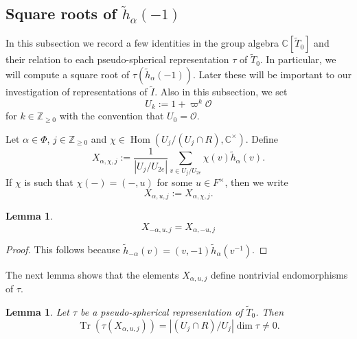 \documentclass[10pt, letterpaper]{amsart}
\theoremstyle{plain}
\newtheorem{Lem}[equation]{Lemma}
\theoremstyle{definition}
\numberwithin{equation}{section}
\newcommand{\Z}{\mathbb{Z}}
\newcommand{\htt}{\tilde{h}}
\newcommand{\It}{\widetilde{I}}
\newcommand{\Tt}{\widetilde{T}}
\newcommand{\Hom}{\operatorname{Hom}}
\newcommand{\Tr}{\operatorname{Tr}}
\newcommand{\Ocal}{\mathcal{O}}
\begin{document}
\subsection{Square roots of $\htt_{\alpha}(-1)$}\label{SSSqRoot}


In this subsection we record a few identities in the group algebra $\mathbb{C}[\Tt_{0}]$ and their relation to each pseudo-spherical representation $\tau$ of $\Tt_{0}$. In particular, we will compute a square root of $\tau(\htt_{\alpha}(-1))$. Later these will be important to our investigation of representations of $\It$. Also in this subsection, we set
\begin{equation}\label{E:U_k_def_subset_of_Ocal}
U_k:=1+\varpi^k\Ocal
\end{equation}
for $k\in\Z_{\geq 0}$ with the convention that $U_0=\Ocal$.

Let $\alpha\in\Phi$, $j\in \mathbb{Z}_{\geq 0}$ and $\chi\in \Hom(U_{j}/(U_{j}\cap R),\mathbb{C}^{\times})$. Define
\begin{equation*}
	X_{\alpha,\chi,j}:=\frac{1}{\left|U_j/U_{2e}\right|}\sum_{v\in U_{j}/U_{2e}}\chi(v)\htt_{\alpha}(v).
\end{equation*}
If $\chi$ is such that $\chi(-)=(-, u)$ for some $u\in F^{\times}$, then we write 
\begin{equation}\label{E:X_alpha_u_j_def}
X_{\alpha,u,j}:=X_{\alpha,\chi,j}.
\end{equation}

\begin{Lem}\label{Xpmalpha}
	\begin{equation*}
		X_{-\alpha,u,j}=X_{\alpha,-u,j}
	\end{equation*}
\end{Lem}

\begin{proof}
	This follows because $\htt_{-\alpha}(v)=(v,-1)\htt_{\alpha}(v^{-1})$.
\end{proof}

The next lemma shows that the elements $X_{\alpha,u,j}$ define nontrivial endomorphisms of $\tau$.

\begin{Lem} Let $\tau$ be a pseudo-spherical representation of $\Tt_{0}$. Then
	\begin{equation*}
		\Tr(\tau (X_{\alpha,u,j})) = |(U_{j}\cap R)/U_{j}|\dim\tau\neq 0.
	\end{equation*}
\end{Lem}
\end{document}
